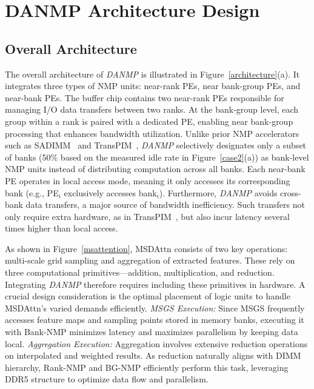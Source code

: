 \documentclass[sigconf]{acmart}
\begin{document}



\section{DANMP Architecture Design}
\label{sec:architecture}

\subsection{Overall Architecture}

The overall architecture of \textit{DANMP} is illustrated in Figure~\ref{architecture}(a). It integrates three types of NMP units: near-rank PEs, near bank-group PEs, and near-bank PEs. The buffer chip contains two near-rank PEs responsible for managing I/O data transfers between two ranks. At the bank-group level, each group within a rank is paired with a dedicated PE, enabling near bank-group processing that enhances bandwidth utilization. Unlike prior NMP accelerators such as SADIMM~\cite{sadimm2025} and TransPIM~\cite{Zhou2022}, \textit{DANMP} selectively designates only a subset of banks (50\% based on the measured idle rate in Figure~\ref{case2}(a)) as bank-level NMP units instead of distributing computation across all banks. Each near-bank PE operates in local access mode, meaning it only accesses its corresponding bank (e.g., PE$_i$ exclusively accesses bank$_i$). Furthermore, \textit{DANMP} avoids cross-bank data transfers, a major source of bandwidth inefficiency. Such transfers not only require extra hardware, as in TransPIM~\cite{Zhou2022}, but also incur latency several times higher than local access.

As shown in Figure~\ref{msattention}, MSDAttn consists of two key operations: multi-scale grid sampling and aggregation of extracted features. These rely on three computational primitives—addition, multiplication, and reduction. Integrating \textit{DANMP} therefore requires including these primitives in hardware. A crucial design consideration is the optimal placement of logic units to handle MSDAttn’s varied demands efficiently. \textit{MSGS Execution:} Since MSGS frequently accesses feature maps and sampling points stored in memory banks, executing it with Bank-NMP minimizes latency and maximizes parallelism by keeping data local. \textit{Aggregation Execution:} Aggregation involves extensive reduction operations on interpolated and weighted results. As reduction naturally aligns with DIMM hierarchy, Rank-NMP and BG-NMP efficiently perform this task, leveraging DDR5 structure to optimize data flow and parallelism.
\end{document}
